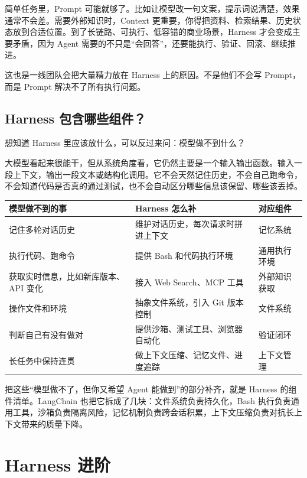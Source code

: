 \documentclass[10pt,a4paper]{ctexart}
\begin{document}
简单任务里，Prompt 可能就够了。比如让模型改一句文案，提示词说清楚，效果通常不会差。需要外部知识时，Context 更重要，你得把资料、检索结果、历史状态放到合适位置。到了长链路、可执行、低容错的商业场景，Harness 才会变成主要矛盾，因为 Agent 需要的不只是“会回答”，还要能执行、验证、回滚、继续推进。



这也是一线团队会把大量精力放在 Harness 上的原因。不是他们不会写 Prompt，而是 Prompt 解决不了所有执行问题。



\subsection{Harness 包含哪些组件？}


想知道 Harness 里应该放什么，可以反过来问：模型做不到什么？



大模型看起来很能干，但从系统角度看，它仍然主要是一个输入输出函数。输入一段上下文，输出一段文本或结构化调用。它不会天然记住历史，不会自己跑命令，不会知道代码是否真的通过测试，也不会自动区分哪些信息该保留、哪些该丢掉。


{\footnotesize
\begin{tabularx}{\textwidth}{|X|X|X|}
\hline
\textbf{模型做不到的事} & \textbf{Harness 怎么补} & \textbf{对应组件} \\
\hline
记住多轮对话历史 & 维护对话历史，每次请求时拼进上下文 & 记忆系统 \\
\hline
执行代码、跑命令 & 提供 Bash 和代码执行环境 & 通用执行环境 \\
\hline
获取实时信息，比如新库版本、API 变化 & 接入 Web Search、MCP 工具 & 外部知识获取 \\
\hline
操作文件和环境 & 抽象文件系统，引入 Git 版本控制 & 文件系统 \\
\hline
判断自己有没有做对 & 提供沙箱、测试工具、浏览器自动化 & 验证闭环 \\
\hline
长任务中保持连贯 & 做上下文压缩、记忆文件、进度追踪 & 上下文管理 \\
\hline
\end{tabularx}
}



把这些“模型做不了，但你又希望 Agent 能做到”的部分补齐，就是 Harness 的组件清单。LangChain 也把它拆成了几块：文件系统负责持久化，Bash 执行负责通用工具，沙箱负责隔离风险，记忆机制负责跨会话积累，上下文压缩负责对抗长上下文带来的质量下降。



\section{Harness 进阶}
\end{document}

